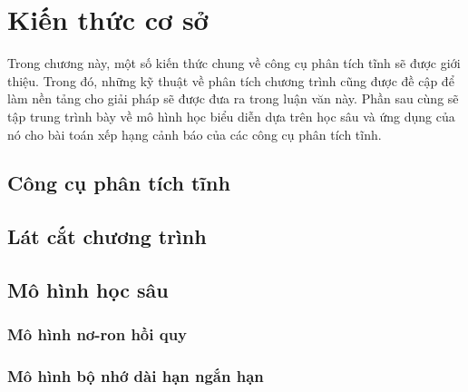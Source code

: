 \chapter{Kiến thức cơ sở}
Trong chương này, một số kiến thức chung về công cụ phân tích tĩnh sẽ được giới thiệu. Trong đó, những kỹ thuật về phân tích chương trình cũng được đề cập để làm nền tảng cho giải pháp sẽ được đưa ra trong luận văn này. Phần sau cùng sẽ tập trung trình bày về mô hình học biểu diễn dựa trên học sâu và ứng dụng của nó cho bài toán xếp hạng cảnh báo của các công cụ phân tích tĩnh.

\section{Công cụ phân tích tĩnh}




\section{Lát cắt chương trình}







\section{Mô hình học sâu}
\subsection{Mô hình nơ-ron hồi quy}
\label{sec:rnn}





\subsection{Mô hình bộ nhớ dài hạn ngắn hạn}










